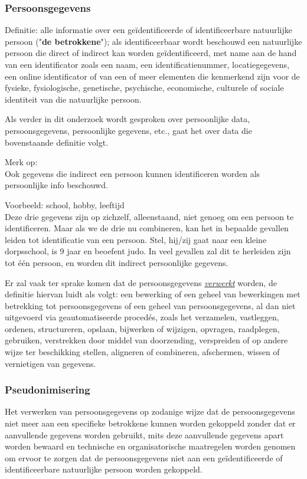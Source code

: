 \subsubsection{Persoonsgegevens} 
Definitie: alle informatie over een geïdentificeerde of identificeerbare natuurlijke persoon ("\textbf{de betrokkene}"); als identificeerbaar wordt beschouwd een natuurlijke persoon die direct of indirect kan worden geïdentificeerd, met name aan de hand van een identificator zoals een naam, een identificatienummer, locatiegegevens, een online identificator of van een of meer elementen die kenmerkend zijn voor de fysieke, fysiologische, genetische, psychische, economische, culturele of sociale identiteit van die natuurlijke persoon.

 Als verder in dit onderzoek wordt gesproken over persoonlijke data, persoonsgegevens, persoonlijke gegevens, etc., gaat het over data die bovenstaande definitie volgt.
 
  Merk op:
  \\ Ook gegevens die indirect een persoon kunnen identificeren worden als persoonlijke info beschouwd. 
 
 Voorbeeld: school, hobby, leeftijd
 \\ Deze drie gegevens zijn op zichzelf, alleenstaand, niet genoeg om een persoon te identificeren.
 Maar als we de drie nu combineren, kan het in bepaalde gevallen leiden tot identificatie van een persoon. Stel, hij/zij gaat naar een kleine dorpsschool, is 9 jaar en beoefent judo. In veel gevallen zal dit te herleiden zijn tot één persoon, en worden dit indirect persoonlijke gegevens. 

Er zal vaak ter sprake komen dat de persoonsgegevens \underline{\textit{verwerkt}} worden, de definitie hiervan luidt als volgt: een bewerking of een geheel van bewerkingen met betrekking tot persoonsgegevens of een geheel van persoonsgegevens, al dan niet uitgevoerd via geautomatiseerde procedés, zoals het verzamelen, vastleggen, ordenen, structureren, opslaan, bijwerken of wijzigen, opvragen, raadplegen, gebruiken, verstrekken door middel van doorzending, verspreiden of op andere wijze ter beschikking stellen, aligneren of combineren, afschermen, wissen of vernietigen van gegevens.

\subsubsection{Pseudonimisering} 
Het verwerken van persoonsgegevens op zodanige wijze dat de persoonsgegevens niet meer aan een specifieke betrokkene kunnen worden gekoppeld zonder dat er aanvullende gegevens worden gebruikt, mits deze aanvullende gegevens apart worden bewaard en technische en organisatorische maatregelen worden genomen om ervoor te zorgen dat de persoonsgegevens niet aan een geïdentificeerde of identificeerbare natuurlijke persoon worden gekoppeld. 

